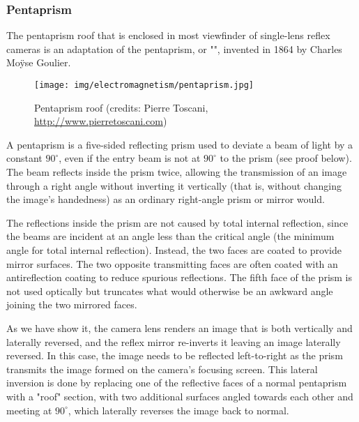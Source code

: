 	\subsubsection{Pentaprism}
	The pentaprism roof that is enclosed  in most viewfinder of single-lens reflex cameras is an adaptation of the pentaprism, or "", invented in 1864 by Charles Moÿse Goulier.
	\begin{figure}[H]
		\centering
		\texttt{[image: img/electromagnetism/pentaprism.jpg]}
		\caption[Pentaprism roof]{Pentaprism roof (credits: Pierre Toscani, \url{http://www.pierretoscani.com})}
	\end{figure}
	A pentaprism is a five-sided reflecting prism used to deviate a beam of light by a constant $90^\circ$, even if the entry beam is not at $90^\circ$ to the prism (see proof below). The beam reflects inside the prism twice, allowing the transmission of an image through a right angle without inverting it vertically (that is, without changing the image's handedness) as an ordinary right-angle prism or mirror would.
	
	
	The reflections inside the prism are not caused by total internal reflection, since the beams are incident at an angle less than the critical angle (the minimum angle for total internal reflection). Instead, the two faces are coated to provide mirror surfaces. The two opposite transmitting faces are often coated with an antireflection coating to reduce spurious reflections. The fifth face of the prism is not used optically but truncates what would otherwise be an awkward angle joining the two mirrored faces.
	
	As we have show it, the camera lens renders an image that is both vertically and laterally reversed, and the reflex mirror re-inverts it leaving an image laterally reversed. In this case, the image needs to be reflected left-to-right as the prism transmits the image formed on the camera's focusing screen. This lateral inversion is done by replacing one of the reflective faces of a normal pentaprism with a "roof" section, with two additional surfaces angled towards each other and meeting at $90^\circ$, which laterally reverses the image back to normal. 
	

